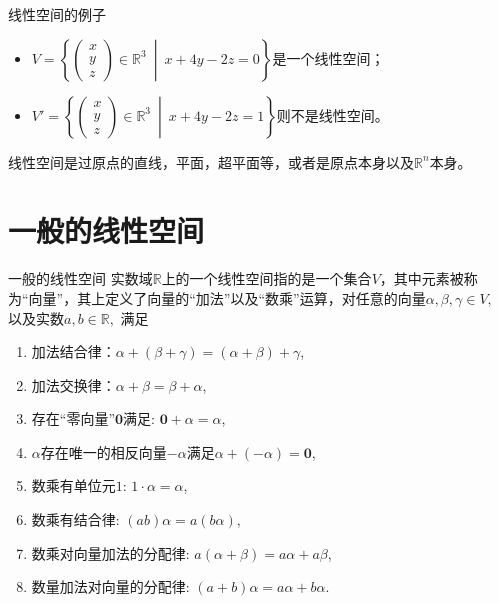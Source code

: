 
\begin{frame}

\begin{block}{线性空间的例子}
\begin{itemize}
\item \(\displaystyle V = \left\{ \begin{pmatrix}
x \\ y \\ z\end{pmatrix} \in \mathbb{R}^3 \ \middle| \ x + 4y -2z = 0\right\} \)是一个线性空间；
\item \(\displaystyle V' = \left\{ \begin{pmatrix}
x \\ y \\ z\end{pmatrix} \in \mathbb{R}^3 \ \middle| \ x + 4y -2z = 1\right\} \)则不是线性空间。
\end{itemize}
\end{block}

\vspace{2em}
\pause

线性空间是{\color{red}过原点}的直线，平面，超平面等，或者是原点本身以及$\mathbb{R}^n$本身。

\end{frame}


\section{一般的线性空间}


\begin{frame}

\begin{block}{一般的线性空间}
实数域$\mathbb{R}$上的一个线性空间指的是一个集合$V$，其中元素被称为``向量''，其上定义了向量的``加法''以及``数乘''运算，对任意的向量$\alpha,\beta,\gamma \in V,$ 以及实数$a,b
 \in \mathbb{R},$ 满足
\begin{enumerate}
\item 加法结合律：$\alpha + (\beta + \gamma) = (\alpha + \beta) + \gamma$,
\item 加法交换律：$\alpha + \beta = \beta + \alpha$,
\item 存在``零向量''$\mathbf{0}$满足: $\mathbf{0} + \alpha = \alpha$,
\item $\alpha$存在唯一的相反向量$-\alpha$满足$\alpha + (-\alpha) = \mathbf{0}$,
\item 数乘有单位元$1$: $1\cdot\alpha = \alpha$,
\item 数乘有结合律: $(ab)\alpha = a(b\alpha)$,
\item 数乘对向量加法的分配律: $a(\alpha + \beta) = a\alpha + a\beta$,
\item 数量加法对向量的分配律: $(a+b)\alpha = a\alpha + b\alpha$.
\end{enumerate}
\end{block}

\end{frame}

